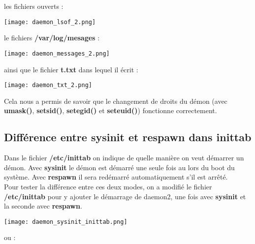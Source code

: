 les fichiers ouverts :

\begin{center} 
\hspace{15cm}
\texttt{[image: daemon\_lsof\_2.png]}
\end{center}
\vspace{0.5cm}

le fichiers \textbf{/var/log/mesages} :

\begin{center} 
\hspace{15cm}
\texttt{[image: daemon\_messages\_2.png]}
\end{center}
\vspace{0.5cm}

ainsi que le fichier \textbf{t.txt} dans lequel il écrit :

\begin{center} 
\hspace{15cm}
\texttt{[image: daemon\_txt\_2.png]}
\end{center}
\vspace{0.5cm}

Cela nous a permis de savoir que le changement de droits du démon (avec \textbf{umask()}, \textbf{setsid()}, \textbf{setegid()} et \textbf{seteuid()}) fonctionne correctement.

\subsection{Différence entre sysinit et respawn dans inittab}

Dans le fichier \textbf{/etc/inittab} on indique de quelle manière on veut démarrer un démon. Avec \textbf{sysinit} le démon est démarré une seule fois au lors du boot du système. Avec \textbf{respawn} il sera redémarré automatiquement s'il est arrêté.\\

Pour tester la différence entre ces deux modes, on a modifié le fichier \textbf{/etc/inittab} pour y ajouter le démarrage de daemon2, une fois avec \textbf{sysinit} et la seconde avec \textbf{respawn}.\\

\begin{center} 
\hspace{15cm}
\texttt{[image: daemon\_sysinit\_inittab.png]}
\end{center}
\vspace{0.5cm}

ou :

